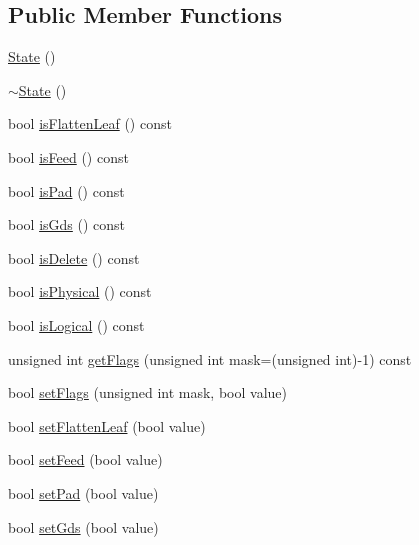 \subsection*{Public Member Functions}
\begin{DoxyCompactItemize}
\item 
\hyperlink{classCRL_1_1Catalog_1_1State_a97e69ca85c09942e20d41013b8ff5280}{State} ()
\item 
\hyperlink{classCRL_1_1Catalog_1_1State_ae25003eae8262a994fba979f28c35aed}{$\sim$\-State} ()
\item 
bool \hyperlink{classCRL_1_1Catalog_1_1State_adb5dc909651479a6556a1f478d585552}{is\-Flatten\-Leaf} () const 
\item 
bool \hyperlink{classCRL_1_1Catalog_1_1State_aab39e2bb6a238a4ae3a82ab8ac4f0593}{is\-Feed} () const 
\item 
bool \hyperlink{classCRL_1_1Catalog_1_1State_ae0f83319e1de5609e1f429c048dab8bb}{is\-Pad} () const 
\item 
bool \hyperlink{classCRL_1_1Catalog_1_1State_ab8f45372b46f9db7855ee98eefdbd5ad}{is\-Gds} () const 
\item 
bool \hyperlink{classCRL_1_1Catalog_1_1State_a860d0ec35b5350f7e70ed30dc999b6dc}{is\-Delete} () const 
\item 
bool \hyperlink{classCRL_1_1Catalog_1_1State_a39c92430456ac8be2ec80310e78170aa}{is\-Physical} () const 
\item 
bool \hyperlink{classCRL_1_1Catalog_1_1State_a084e955d5b7132b0f739951ca82fbb4a}{is\-Logical} () const 
\item 
unsigned int \hyperlink{classCRL_1_1Catalog_1_1State_ac6ec60080ed8b5121be6eb74d12361bd}{get\-Flags} (unsigned int mask=(unsigned int)-\/1) const 
\item 
bool \hyperlink{classCRL_1_1Catalog_1_1State_a73a3866e9da359611638b2d725a79613}{set\-Flags} (unsigned int mask, bool value)
\item 
bool \hyperlink{classCRL_1_1Catalog_1_1State_a4fba9a5ea27f5a36e41f0246124a3095}{set\-Flatten\-Leaf} (bool value)
\item 
bool \hyperlink{classCRL_1_1Catalog_1_1State_ab5936e80369947177be88c3d770f4725}{set\-Feed} (bool value)
\item 
bool \hyperlink{classCRL_1_1Catalog_1_1State_a97e2158809ed0e88237bb92eb8daa290}{set\-Pad} (bool value)
\item 
bool \hyperlink{classCRL_1_1Catalog_1_1State_acc0c819f382393dc780bb19c7788b216}{set\-Gds} (bool value)
\item 

\end{DoxyCompactItemize}
